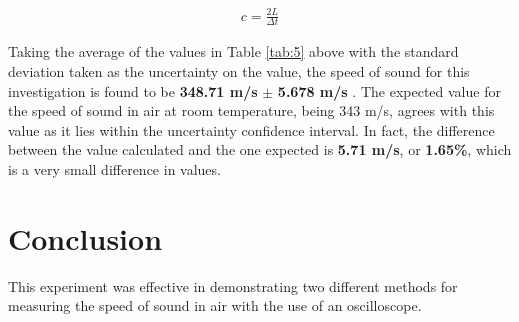 \documentclass[12pt]{article}
\begin{document}
\vspace{-2ex}
\begin{gather} \label{eq:5}
    c = \frac{2L}{\Delta t}
\end{gather}

\begin{table}[H]
    \centering
    \caption{Values calculated for the speed of sound with Eq. \ref{eq:5}}
    \label{tab:5}
\end{table}

Taking the average of the values in Table \ref{tab:5} above with the standard deviation taken as the uncertainty on the value, the speed of sound for this investigation is found to be
\textbf{348.71 m/s} $\mathbf{\pm}$ \textbf{5.678 m/s} . The expected value for the speed of sound in air at room temperature, being 343 m/s, agrees with this value as it lies within the uncertainty confidence interval.
In fact, the difference between the value calculated and the one expected is \textbf{5.71 m/s}, or \textbf{1.65\%}, which is a very small difference in values.

\section{Conclusion} \label{sec:4}

This experiment was effective in demonstrating two different methods for measuring the speed of sound in air with the use of an oscilloscope.
\end{document}
